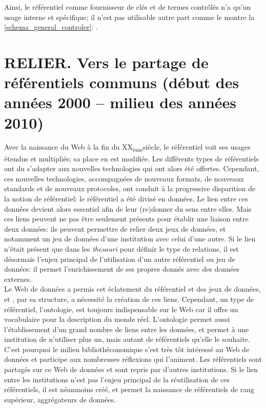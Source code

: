 \documentclass[a4paper,12pt,twoside]{book}
\newcommand{\reference}[1]{\autoref{#1}: \nameref{#1}}
\begin{document}
	Ainsi, le référentiel comme fournisseur de clés et de termes contrôlés n'a qu'un usage interne et spécifique; il n'est pas utilisable autre part comme le montre la \reference{schema_general_controler}.
	
	
	\part{\label{relier}RELIER. Vers le partage de référentiels communs (début des années 2000 – milieu des années 2010)}
	
	Avec la naissance du Web à la fin du \textsc{XX}\textsubscript{ème}siècle, le référentiel voit ses usages étendus et multipliés; sa place en est modifiée. Les différents types de référentiels ont du s'adapter aux nouvelles technologies qui ont alors été offertes. Cependant, ces nouvelles technologies, accompagnées de nouveaux formats, de nouveaux standards et de nouveaux protocoles, ont conduit à la progressive disparition de la notion de référentiel: le référentiel a été divisé en données. Le lien entre ces données devient alors essentiel afin de leur (re)donner du sens entre elles. Mais ces liens peuvent ne pas être seulement présents pour établir une liaison entre deux données: ils peuvent permettre de relier deux jeux de données, et notamment un jeu de données d'une institution avec celui d'une autre. Si le lien n'était présent que dans les \textit{thesauri} pour définir le type de relations, il est désormais l'enjeu principal de l'utilisation d'un autre référentiel ou jeu de données: il permet l'enrichissement de ses propres donnés avec des données externes.\\
	
	Le Web de données a permis cet éclatement du référentiel et des jeux de données, et , par sa structure, a nécessité la création de ces liens. Cependant, un type de référentiel, l'ontologie, est toujours indispensable sur le Web car il offre un vocabulaire pour la description du monde réel. L'ontologie permet aussi l'établissement d'un grand nombre de liens entre les données, et permet à une institution de n'utiliser plus un, mais autant de référentiels qu'elle le souhaite.\\
	
	C'est pourquoi le milieu bibliothéconomique s'est très tôt intéressé au Web de données et participe aux nombreuses réflexions qui l'animent. Les référentiels sont partagés sur ce Web de données et sont repris par d'autres institutions. Si le lien entre les institutions n'est pas l'enjeu principal de la réutilisation de ces référentiels, il est néanmoins créé, et permet la naissance de référentiels de rang supérieur, aggrégateurs de données.
	
\end{document}
